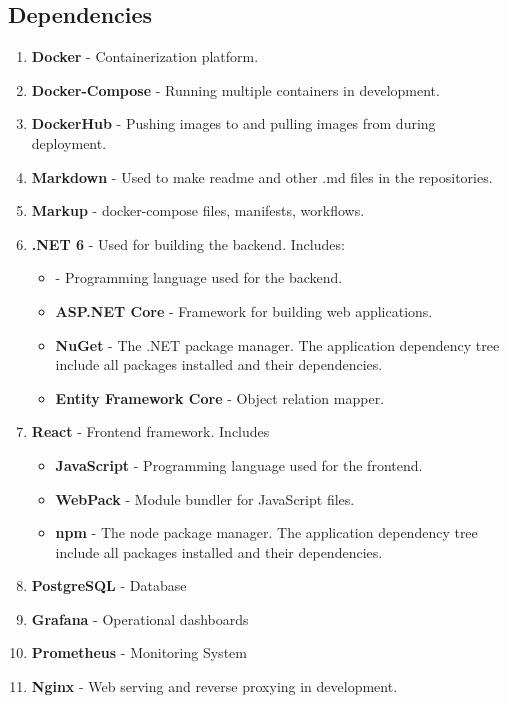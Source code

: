 \subsection{Dependencies}
\begin{enumerate}
    \item \textbf{Docker} - Containerization platform.
    \item \textbf{Docker-Compose} - Running multiple containers in development.
    \item \textbf{DockerHub} - Pushing images to and pulling images from during deployment.
    \item \textbf{Markdown} - Used to make readme and other .md files in the repositories.
    \item \textbf{Markup} - docker-compose files, manifests, workflows.
    \item \textbf{.NET 6} - Used for building the backend. Includes:
    \begin{itemize}
        \item \textbf{} - Programming language used for the backend.
        \item \textbf{ASP.NET Core} - Framework for building web applications.
        \item \textbf{NuGet} - The .NET package manager. The application dependency tree include all packages installed and their dependencies.
        \item \textbf{Entity Framework Core} - Object relation mapper.
    \end{itemize}
    \item \textbf{React} - Frontend framework. Includes
    \begin{itemize}
        \item \textbf{JavaScript} - Programming language used for the frontend.
        \item \textbf{WebPack} - Module bundler for JavaScript files.
        \item \textbf{npm} - The node package manager. The application dependency tree include all packages installed and their dependencies.
    \end{itemize}
    \item \textbf{PostgreSQL} - Database
    \item \textbf{Grafana} - Operational dashboards
    \item \textbf{Prometheus} - Monitoring System
    \item \textbf{Nginx} - Web serving and reverse proxying in development.
    

\end{enumerate}
